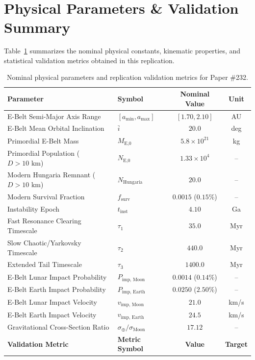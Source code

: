 \documentclass[11pt,a4paper]{article}
\begin{document}
\appendix
\section{Physical Parameters \& Validation Summary}
Table~\ref{tab:parameters} summarizes the nominal physical constants, kinematic properties, and statistical validation metrics obtained in this replication.

\begin{table}[H]
\centering
\caption{Nominal physical parameters and replication validation metrics for Paper \#232.}
\label{tab:parameters}
\begin{tabular}{llcc}
\toprule
\textbf{Parameter} & \textbf{Symbol} & \textbf{Nominal Value} & \textbf{Unit} \\
\midrule
E-Belt Semi-Major Axis Range & $[a_{\text{min}}, a_{\text{max}}]$ & $[1.70, 2.10]$ & AU \\
E-Belt Mean Orbital Inclination & $\bar{i}$ & $20.0$ & deg \\
Primordial E-Belt Mass & $M_{\text{E,0}}$ & $5.8 \times 10^{21}$ & kg \\
Primordial Population ($D > 10\text{ km}$) & $N_{\text{E,0}}$ & $1.33 \times 10^4$ & -- \\
Modern Hungaria Remnant ($D > 10\text{ km}$) & $N_{\text{Hungaria}}$ & $20.0$ & -- \\
Modern Survival Fraction & $f_{\text{surv}}$ & $0.0015$ ($0.15\%$) & -- \\
Instability Epoch & $t_{\text{inst}}$ & $4.10$ & Ga \\
Fast Resonance Clearing Timescale & $\tau_1$ & $35.0$ & Myr \\
Slow Chaotic/Yarkovsky Timescale & $\tau_2$ & $440.0$ & Myr \\
Extended Tail Timescale & $\tau_3$ & $1400.0$ & Myr \\
E-Belt Lunar Impact Probability & $P_{\text{imp, Moon}}$ & $0.0014$ ($0.14\%$) & -- \\
E-Belt Earth Impact Probability & $P_{\text{imp, Earth}}$ & $0.0250$ ($2.50\%$) & -- \\
E-Belt Lunar Impact Velocity & $v_{\text{imp, Moon}}$ & $21.0$ & km/s \\
E-Belt Earth Impact Velocity & $v_{\text{imp, Earth}}$ & $24.5$ & km/s \\
Gravitational Cross-Section Ratio & $\sigma_{\oplus} / \sigma_{\text{Moon}}$ & $17.12$ & -- \\
\midrule
\textbf{Validation Metric} & \textbf{Metric Symbol} & \textbf{Value} & \textbf{Target} \\

\end{tabular}
\end{table}
\end{document}
